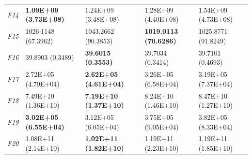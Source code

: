 \begin{table}[!h]
\begin{center}
\begin{tabular}{p{0.5cm}|p{2.5cm}|p{2.5cm}|p{2.5cm}|p{2.5cm}}
\textit{F14} & \textbf{1.09E+09 (3.73E+08)} & 1.24E+09 (3.48E+08) & 1.28E+09 (4.40E+08) & 1.54E+09 (4.73E+08)\\
\textit{F15} & 1026.1148 (67.3962) & 1043.2662 (90.3853) & \textbf{1019.0113 (70.6286)} & 1025.8771 (91.8249)\\
\textit{F16} & 39.8903 (0.3489) & \textbf{39.6015 (0.3553)} & 39.7034 (0.3414) & 39.7101 (0.4693)\\
\textit{F17} & 2.72E+05 (4.79E+04) & \textbf{2.62E+05 (4.61E+04)} & 3.26E+05 (6.58E+04) & 3.19E+05 (7.37E+04)\\
\textit{F18} & 7.49E+10 (1.36E+10) & \textbf{7.19E+10 (1.37E+10)} & 8.24E+10 (1.46E+10) & 8.47E+10 (1.27E+10)\\
\textit{F19} & \textbf{3.02E+05 (6.55E+04)} & 3.12E+05 (6.05E+04) & 3.75E+05 (9.05E+04) & 3.82E+05 (8.33E+04)\\
\textit{F20} & 1.08E+11 (2.14E+10) & \textbf{1.02E+11 (1.82E+10)} & 1.19E+11 (2.23E+10) & 1.19E+11 (1.85E+10)\\
\hline
\end{tabular}
\end{center}
\end{table}

